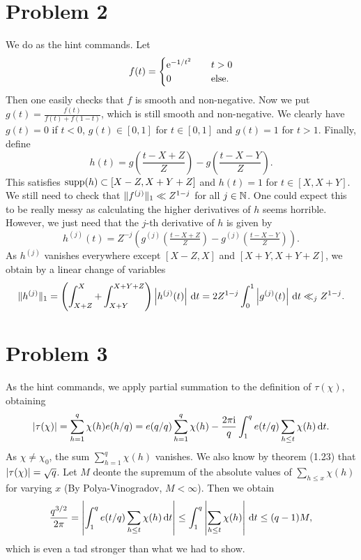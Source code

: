 \documentclass[a4paper,11pt]{article}
\begin{document}
\section*{Problem 2}
We do as the hint commands. Let 
\[
    f(t) = 
    \begin{cases}
        \mathrm e^{-1/t^2} \quad &t>0 \\
        0 \quad & \text{else.}
    \end{cases}
\]
Then one easily checks that $f$ is smooth and non-negative. Now we put 
$g(t) = \frac{f(t)}{f(t) + f(1-t)}$, which is still smooth and non-negative. 
We clearly have $g(t) = 0$ if $t<0$, $g(t) \in [0,1]$ for $t \in [0,1]$ and 
$g(t) = 1$ for $t > 1$. Finally, define 
\[
    h(t) = g \left( \frac{t-X+Z}Z \right) - g \left( \frac{t-X-Y}Z \right).
\]
This satisfies $\textnormal{supp}(h) \subset [X-Z, X+Y+Z]$ and 
$h(t) = 1$ for $t \in [X,X+Y]$. 
We still need to check that $\lVert f^{(j)}\rVert_1 \ll Z^{1-j}$ for all $j \in \mathbb{N}$.
One could expect this to be really messy as calculating the higher derivatives
of $h$ seems horrible. However, we just need that the $j$-th derivative of $h$ 
is given by
\[
    h^{(j)}(t) = Z^{-j} \left( g^{(j)} \left( \tfrac{t-X+Z}Z \right) - g^{(j)}
    \left( \tfrac{t-X-Y}Z \right) \right).
\]
As $h^{(j)}$ vanishes everywhere except $[X-Z,X]$ and $[X+Y, X+Y+Z]$, we obtain
by a linear change of variables 
\[
    \lVert h^{(j)}\rVert_1 = \left(\int_{X+Z}^X + \int_{X+Y}^{X+Y+Z}\right)
    \left\lvert h^{(j)}(t) \right\rvert \mathrm{\,d} t = 2Z^{1-j} \int_0^1 \left\lvert g^{(j)}(t) \right\rvert \mathrm{\,d} t \ll_j Z^{1-j}.
\]


\section*{Problem 3}
As the hint commands, we apply partial summation to the definition of
$\tau(\chi)$, obtaining
\[
    \left\lvert \tau(\chi) \right\rvert = \sum_{h=1}^q \chi(h) e(h/q) = e(q/q) \sum_{h=1}^q
    \chi(h) - \frac{2\pi \mathrm i}{q} \int_1^q e(t/q) \sum_{h \leq t} \chi(h) 
    \mathrm{\,d} t.
\]
As $\chi \neq \chi_0$, the sum $\sum_{h=1}^q \chi(h)$ vanishes. We also
know by theorem (1.23) that $\left\lvert \tau(\chi) \right\rvert = \sqrt q$. 
Let $M$ deonte the supremum of the absolute values of $\sum_{h \leq x}
\chi(h)$ for varying $x$ (By Polya-Vinogradov, $M < \infty$). Then we obtain
\[
    \frac{q^{3/2}}{2 \pi} = \left\lvert \int_1^q e(t/q) \sum_{h \leq t} \chi(h) \mathrm{\,d} t \right\rvert \leq \int_1^q \left\lvert  \sum_{h \leq t}  \chi(h)  \right\rvert \mathrm{\,d} t \leq (q-1)M,
\]
which is even a tad stronger than what we had to show. 
\end{document}
